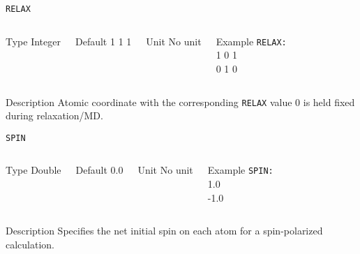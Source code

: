 \documentclass[xcolor=dvipsnames,t]{beamer}
\begin{document}
\begin{frame}[allowframebreaks]{\texttt{RELAX}} \label{RELAX}
\vspace*{-12pt}
\begin{columns}
\begin{block}{Type}
Integer
\end{block}

\begin{block}{Default}
1 1 1
\end{block}

\begin{block}{Unit}
No unit
\end{block}

\begin{block}{Example}
\texttt{RELAX: \\}
1 0 1 \\
0 1 0
\end{block}
\end{columns}

\begin{block}{Description}
Atomic coordinate with the corresponding \texttt{RELAX} value 0 is held fixed during relaxation/MD.
\end{block}

\end{frame}


\begin{frame}[allowframebreaks]{\texttt{SPIN}} \label{SPIN}
\vspace*{-12pt}
\begin{columns}
\begin{block}{Type}
Double
\end{block}

\begin{block}{Default}
0.0
\end{block}

\begin{block}{Unit}
No unit
\end{block}

\begin{block}{Example}
\texttt{SPIN: \\}
1.0 \\
-1.0
\end{block}
\end{columns}

\begin{block}{Description}
Specifies the net initial spin on each atom for a spin-polarized calculation.
\end{block}

\end{frame}
\end{document}
